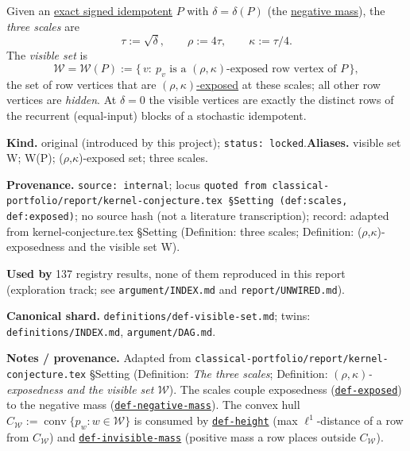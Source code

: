 \hypertarget{def:visible-set}{}%
\begin{definition}\label{def:visible-set}
Given an \hyperref[def:signed-idempotent]{exact signed idempotent} $P$ with
$\delta=\delta(P)$ (the \hyperref[def:negative-mass]{negative mass}), the \emph{three scales} are
\[\tau:=\sqrt\delta,\qquad \rho:=4\tau,\qquad \kappa:=\tau/4.\]
The \emph{visible set} is
\[\mathcal W=\mathcal W(P):=\{\,v:\ p_v\text{ is a }(\rho,\kappa)\text{-exposed row vertex of }P\,\},\]
the set of row vertices that are \hyperref[def:exposed]{$(\rho,\kappa)$-exposed} at these scales; all other row
vertices are \emph{hidden}. At $\delta=0$ the visible vertices are exactly the distinct rows of the recurrent
(equal-input) blocks of a stochastic idempotent.
\end{definition}
\begin{defnote}
\textbf{Kind.} original (introduced by this project); \texttt{status: locked}.\quad\textbf{Aliases.} visible set W; W(P); ($\rho$,$\kappa$)-exposed set; three scales.
\par
\textbf{Provenance.} \texttt{source: internal}; locus \texttt{quoted from classical-\allowbreak{}portfolio/\allowbreak{}report/\allowbreak{}kernel-\allowbreak{}conjecture.\allowbreak{}tex \S{}Setting (def:\allowbreak{}scales,\allowbreak{} def:\allowbreak{}exposed)}; no source hash (not a literature transcription); record: adapted from kernel-\allowbreak{}conjecture.\allowbreak{}tex \S{}Setting (Definition:\allowbreak{} three scales;\allowbreak{} Definition:\allowbreak{} (\textnormal{$\rho$},\textnormal{$\kappa$})-\allowbreak{}exposedness and the visible set W).
\par
\textbf{Used by} 137 registry results, none of them reproduced in this report (exploration track; see \texttt{argument/INDEX.md} and \texttt{report/UNWIRED.md}).
\par
\textbf{Canonical shard.} \texttt{definitions/\allowbreak{}def-\allowbreak{}visible-\allowbreak{}set.\allowbreak{}md}; twins: \texttt{definitions/INDEX.md}, \texttt{argument/DAG.md}.
\par
\textbf{Notes / provenance.} Adapted from \texttt{classical-\allowbreak{}portfolio/\allowbreak{}report/\allowbreak{}kernel-\allowbreak{}conjecture.\allowbreak{}tex} \S{}Setting
(Definition: \emph{The three scales}; Definition: \emph{$(\rho,\kappa)$-exposedness and the visible set $\mathcal W$}).
The scales couple exposedness (\hyperref[def:exposed]{\texttt{def-\allowbreak{}exposed}}) to the negative mass (\hyperref[def:negative-mass]{\texttt{def-\allowbreak{}negative-\allowbreak{}mass}}). The convex
hull $C_{\mathcal W}:=\operatorname{conv}\{p_w:w\in\mathcal W\}$ is consumed by \hyperref[def:height]{\texttt{def-\allowbreak{}height}} (max
$\ell^1$-distance of a row from $C_{\mathcal W}$) and \hyperref[def:invisible-mass]{\texttt{def-\allowbreak{}invisible-\allowbreak{}mass}} (positive mass a row places
outside $C_{\mathcal W}$).
\end{defnote}

